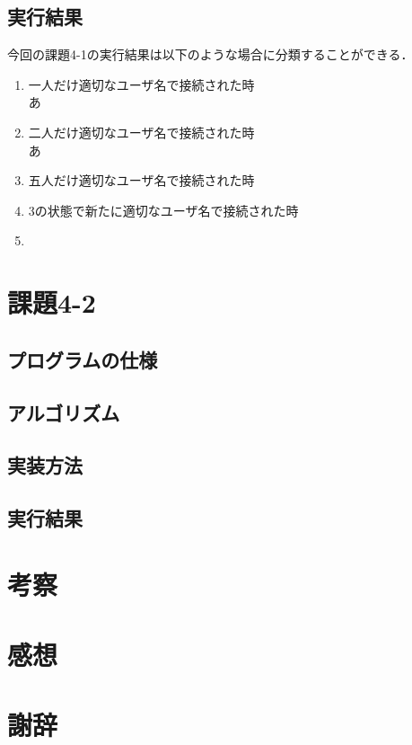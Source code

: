 \documentclass[dvipdfmx]{jarticle}
\begin{document}
\subsection{実行結果}
今回の課題4-1の実行結果は以下のような場合に分類することができる．
\begin{enumerate}
    \item 一人だけ適切なユーザ名で接続された時\\
    あ
    \item 二人だけ適切なユーザ名で接続された時\\
    あ
    \item 五人だけ適切なユーザ名で接続された時\\
    \item 3の状態で新たに適切なユーザ名で接続された時\\
    \item 
\end{enumerate}
\section{課題4-2}
\subsection{プログラムの仕様}
\subsection{アルゴリズム}
\subsection{実装方法}
\subsection{実行結果}
\section{考察}
\section{感想}
\section{謝辞}
\end{document}
